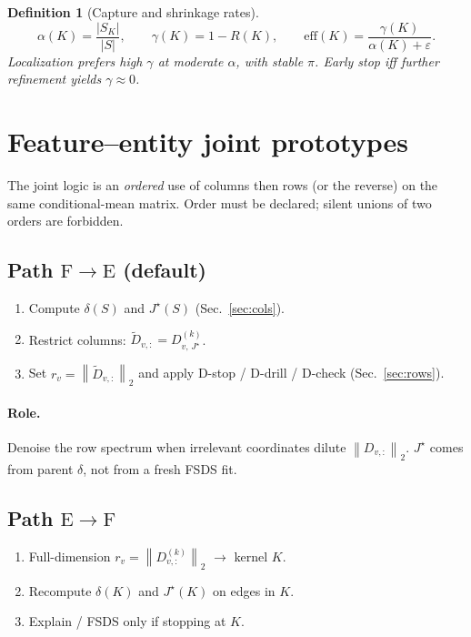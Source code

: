 \documentclass[11pt]{article}
\newtheorem{definition}{Definition}
\newcommand{\norm}[1]{\left\|#1\right\|_2}
\begin{document}
\begin{definition}[Capture and shrinkage rates]
\[
  \alpha(K)=\frac{|S_K|}{|S|},
  \qquad
  \gamma(K)=1-R(K),
  \qquad
  \mathrm{eff}(K)=\frac{\gamma(K)}{\alpha(K)+\varepsilon}.
\]
Localization prefers high \(\gamma\) at moderate \(\alpha\), with stable
\(\pi\). Early stop iff further refinement yields \(\gamma\approx 0\).
\end{definition}

\section{Feature--entity joint prototypes}
\label{sec:joint}

The joint logic is an \emph{ordered} use of columns then rows (or the
reverse) on the same conditional-mean matrix. Order must be declared;
silent unions of two orders are forbidden.

\subsection{Path \(\mathrm{F}\to\mathrm{E}\) (default)}
\label{sec:FE}

\begin{enumerate}[leftmargin=1.6em]
  \item Compute \(\delta(S)\) and \(J^\star(S)\) (Sec.~\ref{sec:cols}).
  \item Restrict columns:
    \(\widetilde D_{v,:}=D^{(k)}_{v,\,J^\star}\).
  \item Set \(r_v=\norm{\widetilde D_{v,:}}\) and apply D-stop / D-drill /
    D-check (Sec.~\ref{sec:rows}).
\end{enumerate}
\paragraph{Role.} Denoise the row spectrum when irrelevant coordinates
dilute \(\norm{D_{v,:}}\). \(J^\star\) comes from parent \(\delta\), not
from a fresh FSDS fit.

\subsection{Path \(\mathrm{E}\to\mathrm{F}\)}
\label{sec:EF}

\begin{enumerate}[leftmargin=1.6em]
  \item Full-dimension \(r_v=\norm{D^{(k)}_{v,:}}\) \(\to\) kernel \(K\).
  \item Recompute \(\delta(K)\) and \(J^\star(K)\) on edges in \(K\).
  \item Explain / FSDS only if stopping at \(K\).
\end{enumerate}
\end{document}
